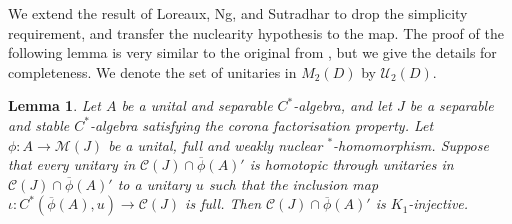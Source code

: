 \documentclass[reqno]{amsart}
\newtheorem{lem}[thm]{Lemma}
\theoremstyle{definition}
\theoremstyle{remark}
\numberwithin{equation}{section}
\theoremstyle{definition}
\newcommand{\calC}{\mathcal{C}}
\newcommand{\calM}{\mathcal{M}}
\newcommand{\calU}{\mathcal{U}}
\begin{document}
We extend the result of Loreaux, Ng, and Sutradhar  to drop the simplicity requirement, and transfer the nuclearity hypothesis to the map.  The proof of the following lemma is very similar to the original from \cite[Theorem 2.15]{K1-injective}, but we give the details for completeness. We denote the set of unitaries in $M_{2}(D)$ by $\calU_{2}(D)$. 

\begin{lem} 
\label{sufficient_K1} 
Let $A$ be a unital and separable $C^*$-algebra, and let $J$ be a separable and stable $C^*$-algebra satisfying the corona factorisation property. Let $\phi: A\rightarrow \calM(J)$ be a unital, full and weakly nuclear $^*$-homomorphism. Suppose that every unitary in $\calC(J)\cap \overline{\phi}(A)'$ is homotopic through unitaries in $\calC(J)\cap \overline{\phi}(A)'$ to a unitary $u$ such that the inclusion map $\iota: C^*(\overline{\phi}(A), u) \rightarrow \calC(J)$ is full. Then $\calC(J) \cap \overline{\phi}(A)'$ is $K_{1}$-injective. 
\end{lem} 
\end{document}
